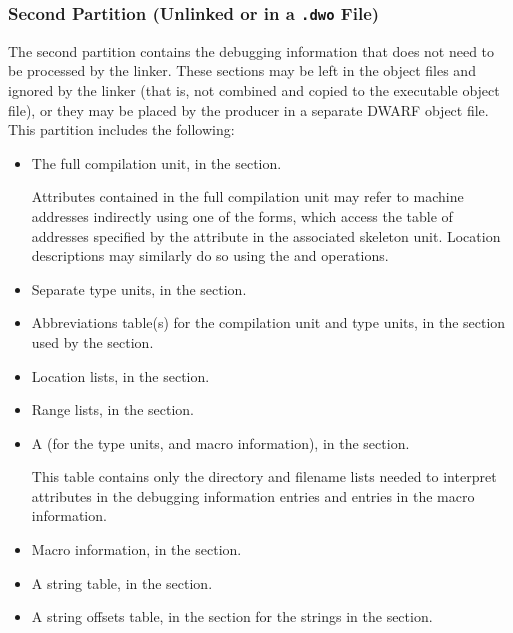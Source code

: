 \subsubsection{Second Partition (Unlinked or in a \texttt{.dwo} File)}
The second partition contains the debugging information that
does not need to be processed by the linker. These sections
may be left in the object files and ignored by the linker
(that is, not combined and copied to the executable object file), or
they may be placed by the producer in a separate DWARF object
file. This partition includes the following:
\begin{itemize}
\item
The full compilation unit, in the \dotdebuginfodwo{} section.

Attributes contained in the full compilation unit
may refer to machine addresses indirectly using 
one of the \DWFORMaddrxXNor{} 
forms, which access the table of addresses specified by the
\DWATaddrbase{} attribute in the associated skeleton unit.
Location descriptions may similarly do so using the \DWOPaddrx{} and
\DWOPconstx{} operations. 

\item Separate type units, in the \dotdebuginfodwo{} section.

\item
Abbreviations table(s) for the compilation unit and type
units, in the \dotdebugabbrevdwo{} section
used by the \dotdebuginfodwo{} section.

\item Location lists, in the 
\dotdebugloclistsdwo{} section.

\item Range lists, in the \dotdebugrnglistsdwo{} section.

\item
A  (for the type 
\bb
units, and macro information), 
\eb
in the \dotdebuglinedwo{} section. 

This table
contains only the directory and filename lists needed to
interpret \DWATdeclfile{} attributes in the debugging
information entries
\bb
and \DWMACROstartfile{} entries in the macro information.
\eb

\item Macro information, in the \dotdebugmacrodwo{} section.

\item A string table, in the \dotdebugstrdwo{} section.

\item A string offsets table, in the \dotdebugstroffsetsdwo{}
section
for the strings in the \dotdebugstrdwo{} section.
\end{itemize}

